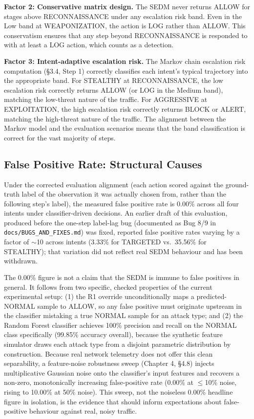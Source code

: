 \textbf{Factor 2: Conservative matrix design.}
The SEDM never returns ALLOW for stages above RECONNAISSANCE under any
escalation risk band.
Even in the Low band at WEAPONIZATION, the action is LOG rather than ALLOW.
This conservatism ensures that any step beyond RECONNAISSANCE is responded
to with at least a LOG action, which counts as a detection.

\textbf{Factor 3: Intent-adaptive escalation risk.}
The Markov chain escalation risk computation (\S3.4, Step 1) correctly
classifies each intent's typical trajectory into the appropriate band.
For STEALTHY at RECONNAISSANCE, the low escalation risk correctly returns
ALLOW (or LOG in the Medium band), matching the low-threat nature of the
traffic.
For AGGRESSIVE at EXPLOITATION, the high escalation risk correctly returns
BLOCK or ALERT, matching the high-threat nature of the traffic.
The alignment between the Markov model and the evaluation scenarios means
that the band classification is correct for the vast majority of steps.

\subsection{False Positive Rate: Structural Causes}

Under the corrected evaluation alignment (each action scored against the
ground-truth label of the observation it was actually chosen from, rather
than the following step's label), the measured false positive rate is
0.00\% across all four intents under classifier-driven decisions. An
earlier draft of this evaluation, produced before the one-step label-lag
bug (documented as Bug 8/9 in \texttt{docs/BUGS\_AND\_FIXES.md}) was fixed,
reported false positive rates varying by a factor of $\sim$10 across
intents (3.33\% for TARGETED vs.\ 35.56\% for STEALTHY); that variation did
not reflect real SEDM behaviour and has been withdrawn.

The 0.00\% figure is not a claim that the SEDM is immune to false positives
in general.
It follows from two specific, checked properties of the current
experimental setup: (1) the R1 override unconditionally maps a
predicted-NORMAL sample to ALLOW, so any false positive must originate
upstream in the classifier mistaking a true NORMAL sample for an attack
type; and (2) the Random Forest classifier achieves 100\% precision and
recall on the NORMAL class specifically (99.85\% accuracy overall), because
the synthetic feature simulator draws each attack type from a disjoint
parametric distribution by construction.
Because real network telemetry does not offer this clean separability, a
feature-noise robustness sweep (Chapter 4, \S4.8) injects multiplicative
Gaussian noise onto the classifier's input features and recovers a
non-zero, monotonically increasing false-positive rate (0.00\% at
$\le$10\% noise, rising to 10.00\% at 50\% noise).
This sweep, not the noiseless 0.00\% headline figure in isolation, is the
evidence that should inform expectations about false-positive behaviour
against real, noisy traffic.

